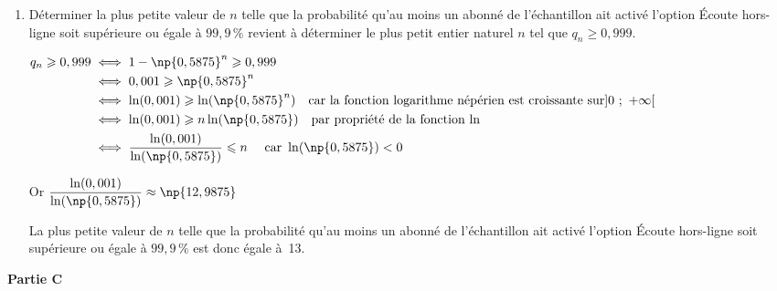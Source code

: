 \begin{enumerate}
\begin{enumerate}
Pour tout $n$ entier naturel non nul, on a bien \quad $q_{n}=1- \np{0,5875}^{n}$.

		\item Déterminer la plus petite valeur de $n$ telle que la probabilité qu'au moins un abonné de l'échantillon ait activé l'option \og Écoute hors-ligne\fg{} soit supérieure ou égale à $99,9\,\%$ revient à déterminer le plus petit entier naturel $n$ tel que $q_n \geqslant 0,999$.

$\begin{aligned}
q_n \geqslant 0,999 & \iff 1-\np{0,5875}^{n} \geqslant0,999 \\
& \iff 0,001 \geqslant \np{0,5875}^n \\
& \iff \ln(0,001) \geqslant \ln (\np{0,5875}^n) \quad \text{car la fonction logarithme népérien est croissante sur} ]0~;~+\infty[\\
& \iff \ln(0,001) \geqslant n\ln (\np{0,5875}) \quad \text{par propriété de la fonction ln}\\
& \iff \dfrac{\ln(0,001)}{\ln(\np{0,5875})} \leqslant n \quad \text{ car } \ln(\np{0,5875}) < 0
\end{aligned}$

Or $\dfrac{\ln(0,001)}{\ln(\np{0,5875})} \approx \np{12,9875}$

La plus petite valeur de $n$ telle que la probabilité qu'au moins un abonné de l'échantillon ait activé l'option \og Écoute hors-ligne\fg{} soit supérieure ou égale à $99,9\,\%$ est donc égale à~13.
	\end{enumerate}
\end{enumerate}

	\textbf{Partie C}

